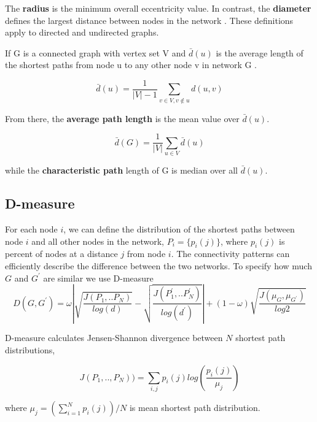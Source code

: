 The \textbf{radius} is the minimum overall eccentricity value. In contrast, the \textbf{diameter} defines the largest distance between nodes in the network \cite{van2010graph}. These definitions apply to directed and undirected graphs. 

If G is a connected graph with vertex set V and $\bar{d}(u)$ is the average length of the shortest paths from node u to any other node v in network G \cite{van2010graph}.

\begin{equation}
\bar{d}(u) = \frac{1}{|V|-1} \sum_{v\in V, v \notin u} d(u,v)  
\end{equation}

From there, the \textbf{average path length} is the mean value over $\bar{d}(u)$.

\begin{equation}
\bar{d}(G) = \frac{1}{|V|}\sum_{u \in V} \bar{d}(u)
\end{equation}

while the \textbf{characteristic path} length of G is median over all $\bar{d}(u)$.


\subsection{D-measure}

For each node $i$, we can define the distribution of the shortest paths between node $i$ and all other nodes in the network, $P_{i}=\{p_{i}(j)\}$, where $p_{i}(j)$ is percent of nodes at a distance $j$ from node $i$. The connectivity patterns can efficiently describe the difference between the two networks.    
To specify how much $G$ and $G^{'}$ are similar we use D-measure \cite{tiago2}
\begin{equation}
D(G, G^{'}) = \omega \left| \sqrt{\frac{J(P_1,..P_N)}{log(d)}}-\sqrt{\frac{J(P_1^{'},..P_N^{'})}{log(d^{'})}} \right| + (1-\omega) \sqrt{\frac{J(\mu_{G},\mu_{G^{'}})}{log2}}
\label{eq:dmeasure}
\end{equation}

D-measure calculates Jensen-Shannon divergence between $N$ shortest path distributions,

\begin{equation}
J(P_1,.., P_N)) = \sum_{i,j}p_i(j)log(\frac{p_i(j)}{\mu_j})
\end{equation}

where  $\mu_j = (\sum_{i=1}^N p_i(j))/N$ is mean shortest path distribution.

